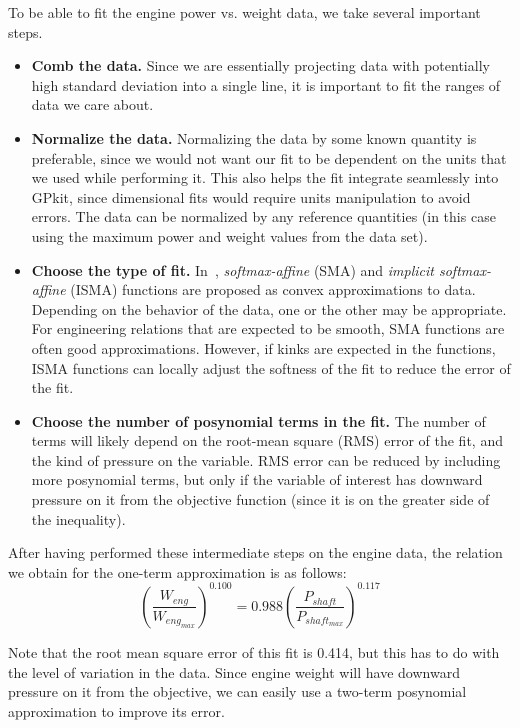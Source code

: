 To be able to fit the engine power vs. weight data, we take several important steps.
\begin{itemize}
    \item \textbf{Comb the data.} Since we are essentially projecting
    data with potentially high standard deviation into a single line,
    it is important to fit the ranges of data we care about.
    \item \textbf{Normalize the data.} Normalizing the data
	by some known quantity is preferable, since we would not want our fit to be dependent on the
	units that we used while performing it. This also helps the fit integrate
    seamlessly into GPkit, since dimensional fits would require units manipulation
    to avoid errors. The data can be normalized by any
    reference quantities (in this case using the maximum power and weight values
    from the data set).
    \item \textbf{Choose the type of fit.} In~\cite{gpfitpaper}, \textit{softmax-affine}
    (SMA) and \textit{implicit softmax-affine} (ISMA)
    functions are proposed as convex approximations
    to data. Depending on the behavior of the data, one or the other
    may be appropriate. For engineering relations that are expected to be smooth, SMA
    functions are often good approximations. However, if kinks are expected in the
    functions, ISMA functions can locally adjust the softness of the fit to
    reduce the error of the fit.
    \item \textbf{Choose the number of posynomial terms in the fit.} The number of
    terms will likely depend on the root-mean square (RMS) error of the fit, and
    the kind of pressure on the variable. RMS error can be reduced by including
    more posynomial terms, but only if the variable of interest has downward
    pressure on it from the objective function (since it is on the greater side
    of the inequality).
\end{itemize}

After having performed these intermediate steps on the engine data,
the relation we obtain for the one-term approximation is as follows:
\begin{equation}
	(\frac{W_{eng}}{W_{eng_{max}}})^{0.100} = 0.988 (\frac{P_{shaft}}{P_{shaft_{max}}})^{0.117}
\end{equation}

Note that the root mean square error of this fit is 0.414, but this has to do with 
the level of variation in the data. Since engine weight will have downward pressure
on it from the objective, we can easily use a two-term posynomial approximation to 
improve its error. 

